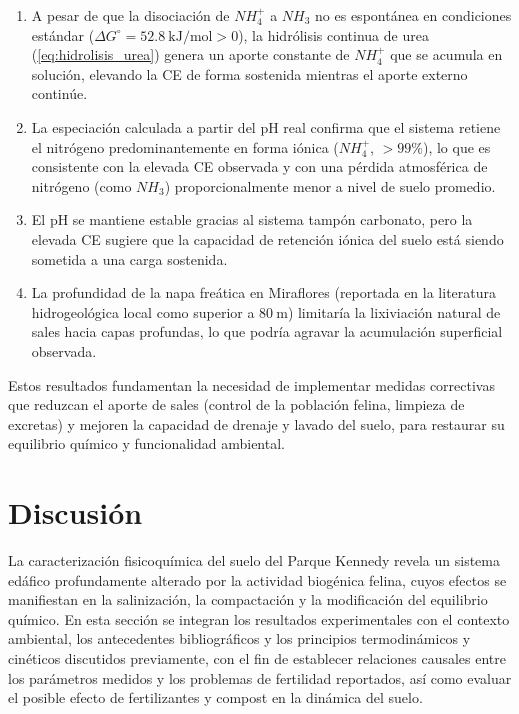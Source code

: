 \documentclass[fleqn]{jaes}
\begin{document}
\begin{enumerate}
  \item A pesar de que la disociación de $NH_4^+$ a $NH_3$ no es espontánea en condiciones estándar ($\Delta G^\circ = 52.8~\text{kJ/mol} > 0$), la hidrólisis continua de urea (\cref{eq:hidrolisis_urea}) genera un aporte constante de $NH_4^+$ que se acumula en solución, elevando la CE de forma sostenida mientras el aporte externo continúe.
  \item La especiación calculada a partir del pH real confirma que el sistema retiene el nitrógeno predominantemente en forma iónica ($NH_4^+$, $>99\%$), lo que es consistente con la elevada CE observada y con una pérdida atmosférica de nitrógeno (como $NH_3$) proporcionalmente menor a nivel de suelo promedio.
  \item El pH se mantiene estable gracias al sistema tampón carbonato, pero la elevada CE sugiere que la capacidad de retención iónica del suelo está siendo sometida a una carga sostenida.
  \item La profundidad de la napa freática en Miraflores (reportada en la literatura hidrogeológica local como superior a $80~\text{m}$) limitaría la lixiviación natural de sales hacia capas profundas, lo que podría agravar la acumulación superficial observada.
\end{enumerate}

Estos resultados fundamentan la necesidad de implementar medidas correctivas que reduzcan el aporte de sales (control de la población felina, limpieza de excretas) y mejoren la capacidad de drenaje y lavado del suelo, para restaurar su equilibrio químico y funcionalidad ambiental.

\section{Discusión}\label{sec:discusion}

La caracterización fisicoquímica del suelo del Parque Kennedy revela un sistema edáfico profundamente alterado por la actividad biogénica felina, cuyos efectos se manifiestan en la salinización, la compactación y la modificación del equilibrio químico. En esta sección se integran los resultados experimentales con el contexto ambiental, los antecedentes bibliográficos y los principios termodinámicos y cinéticos discutidos previamente, con el fin de establecer relaciones causales entre los parámetros medidos y los problemas de fertilidad reportados, así como evaluar el posible efecto de fertilizantes y compost en la dinámica del suelo.
\end{document}
